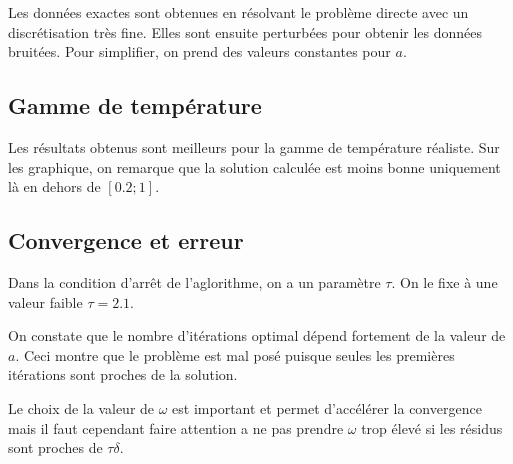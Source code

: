 \documentclass[a4paper,10pt]{article}
\begin{document}
Les données exactes sont obtenues en résolvant le problème directe avec un discrétisation très fine. Elles sont ensuite perturbées pour obtenir les données bruitées. Pour simplifier, on prend des valeurs constantes pour $a$.

\subsection{Gamme de température}

Les résultats obtenus sont meilleurs pour la gamme de température réaliste. Sur les graphique, on remarque que la solution calculée est moins bonne uniquement là en dehors de $[0.2;1]$.

\subsection{Convergence et erreur}

Dans la condition d'arr\^et de l'aglorithme, on a un paramètre $\tau$. On le fixe à une valeur faible $\tau = 2.1$.

On constate que le nombre d'itérations optimal dépend fortement de la valeur de $a$. Ceci montre que le problème est mal posé puisque seules les premières itérations sont proches de la solution.

Le choix de la valeur de $\omega$ est important et permet d'accélérer la convergence mais il faut cependant faire attention a ne pas prendre $\omega$ trop élevé si les résidus sont proches de $\tau \delta$.


\clearpage
\end{document}
